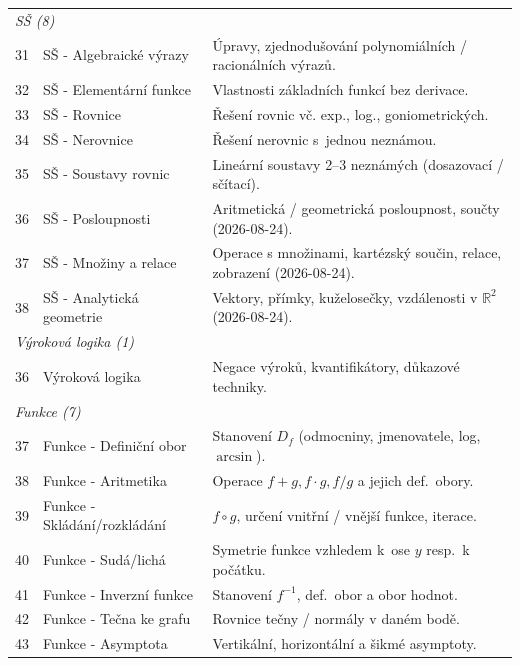 \documentclass[11pt,a4paper]{article}
\begin{document}
\begin{longtable}{p{1cm}p{6cm}p{8.5cm}}
  \multicolumn{3}{l}{\textit{SŠ (8)}} \\[2pt]
  31 & SŠ - Algebraické výrazy                 & Úpravy, zjednodušování polynomiálních / racionálních výrazů. \\
  32 & SŠ - Elementární funkce                 & Vlastnosti základních funkcí bez derivace. \\
  33 & SŠ - Rovnice                            & Řešení rovnic vč. exp., log., goniometrických. \\
  34 & SŠ - Nerovnice                          & Řešení nerovnic s~jednou neznámou. \\
  35 & SŠ - Soustavy rovnic                    & Lineární soustavy 2--3 neznámých (dosazovací / sčítací). \\
  36 & SŠ - Posloupnosti                       & Aritmetická / geometrická posloupnost, součty (2026-08-24). \\
  37 & SŠ - Množiny a relace                   & Operace s množinami, kartézský součin, relace, zobrazení (2026-08-24). \\
  38 & SŠ - Analytická geometrie               & Vektory, přímky, kuželosečky, vzdálenosti v $\mathbb{R}^2$ (2026-08-24). \\[4pt]

  \multicolumn{3}{l}{\textit{Výroková logika (1)}} \\[2pt]
  36 & Výroková logika                         & Negace výroků, kvantifikátory, důkazové techniky. \\[4pt]

  \multicolumn{3}{l}{\textit{Funkce (7)}} \\[2pt]
  37 & Funkce - Definiční obor                 & Stanovení $D_f$ (odmocniny, jmenovatele, log, $\arcsin$). \\
  38 & Funkce - Aritmetika                     & Operace $f+g, f\cdot g, f/g$ a jejich def.~obory. \\
  39 & Funkce - Skládání/rozkládání            & $f \circ g$, určení vnitřní / vnější funkce, iterace. \\
  40 & Funkce - Sudá/lichá                     & Symetrie funkce vzhledem k~ose $y$ resp.~k počátku. \\
  41 & Funkce - Inverzní funkce                & Stanovení $f^{-1}$, def.~obor a obor hodnot. \\
  42 & Funkce - Tečna ke grafu                 & Rovnice tečny / normály v daném bodě. \\
  43 & Funkce - Asymptota                      & Vertikální, horizontální a šikmé asymptoty. \\[4pt]


\end{longtable}
\end{document}
